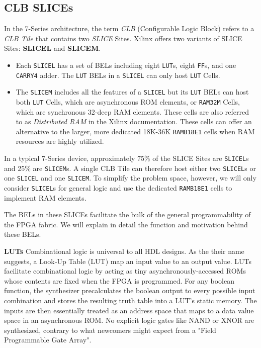 \documentclass{article}
\begin{document}
    \vfill
    \begin{multicols}{2}

    \newpage
    \subsection{CLB SLICEs}

    In the 7-Series architecture, the term \emph{CLB} (Configurable Logic Block) refers to a \emph{CLB Tile} that contains two \emph{SLICE} Sites. 
    Xilinx offers two variants of SLICE Sites: \textbf{SLICEL} and \textbf{SLICEM}.
    \begin{itemize}
        \item Each \texttt{SLICEL} has a set of BELs including eight \texttt{LUT}s, eight \texttt{FF}s, and one \texttt{CARRY4} adder. The \texttt{LUT} BELs in a \texttt{SLICEL} can only host \texttt{LUT} Cells. 
        \item The \texttt{SLICEM} includes all the features of a \texttt{SLICEL} but its \texttt{LUT} BELs can host both \texttt{LUT} Cells, which are asynchronous ROM elements, or \texttt{RAM32M} Cells, which are synchronous 32-deep RAM elements. These cells are also referred to as \emph{Distributed RAM} in the Xilinx documentation.
            These cells can offer an alternative to the larger, more dedicated 18K-36K \texttt{RAMB18E1} cells when RAM resources are highly utilized. 
    \end{itemize}
    In a typical 7-Series device, approximately 75\% of the SLICE Sites are \texttt{SLICEL}s and 25\% are \texttt{SLICEM}s. 
    A single CLB Tile can therefore host either two \texttt{SLICEL}s or one \texttt{SLICEL} and one \texttt{SLICEM}.
    To simplify the problem space, however, we will only consider \texttt{SLICEL}s for general logic and use the dedicated \texttt{RAMB18E1} cells to implement RAM elements. 

    The BELs in these SLICEs facilitate the bulk of the general programmability of the FPGA fabric. 
    We will explain in detail the function and motivation behind these BELs. 


    \textbf{LUTs} \quad
        Combinational logic is universal to all HDL designs. 
        As the their name suggests, a Look‑Up Table (LUT) map an input value to an output value. 
        LUTs facilitate combinational logic by acting as tiny asynchronously‑accessed ROMs whose contents are fixed when the FPGA is programmed.  
        For any boolean function, the synthesizer precalculates the boolean output to every possible input combination and stores the resulting truth table into a LUT's static memory. 
        The inputs are then essentially treated as an address space that maps to a data value space in an asynchronous ROM. 
        No explicit logic gates like NAND or XNOR are synthesized, contrary to what newcomers might expect from a "Field Programmable Gate Array". 


\end{multicols}
\end{document}
